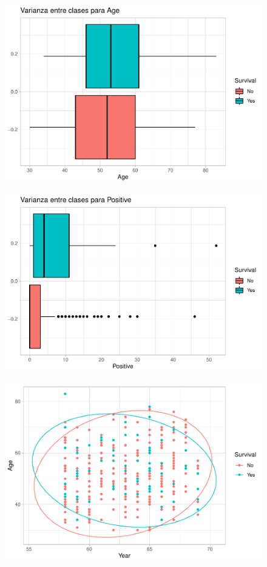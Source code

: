 \begin{figure}[H]\center\includegraphics[width=.8\linewidth]{img/Clasificacion_files/figure-latex/unnamed-chunk-17-2}\caption{}\end{figure}

\begin{figure}[H]\center\includegraphics[width=.8\linewidth]{img/Clasificacion_files/figure-latex/unnamed-chunk-17-3}\caption{}\end{figure}

\begin{figure}[H]\center\includegraphics[width=.8\linewidth]{img/Clasificacion_files/figure-latex/unnamed-chunk-18-1}\caption{}\end{figure}

